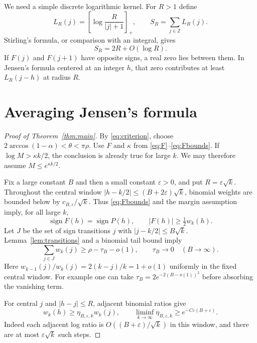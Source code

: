 \documentclass[11pt]{article}
\theoremstyle{remark}\newtheorem{remark}[theorem]{Remark}
\DeclareMathOperator{\sign}{sign}
\begin{document}
We need a simple discrete logarithmic kernel. For $R>1$ define
\[
 L_R(j)=\left[\log\frac{R}{|j|+1}\right]_+,
 \qquad S_R=\sum_{j\in\mathbb Z}L_R(j).
\]
Stirling's formula, or comparison with an integral, gives
\begin{equation}\label{eq:SR}
 S_R=2R+O(\log R).
\end{equation}
If $F(j)$ and $F(j+1)$ have opposite signs, a real zero lies between
them. In Jensen's formula centered at an integer $h$, that zero
contributes at least $L_R(j-h)$ at radius $R$.

\section{Averaging Jensen's formula}
\begin{proof}[Proof of Theorem~\ref{thm:main}]
By \eqref{eq:criterion}, choose
$2\arccos(1-\alpha)<\theta<\pi\rho$.
Use $F$ and $\kappa$ from \eqref{eq:F}--\eqref{eq:Fbounds}.
If $\log M>\kappa k/2$, the conclusion is already true for large $k$.
We may therefore assume $M\le e^{\kappa k/2}$.

Fix a large constant $B$ and then a small constant $\varepsilon>0$,
and put $R=\varepsilon\sqrt{k}$. Throughout the central window
$|h-k/2|\le(B+2\varepsilon)\sqrt{k}$, binomial weights are bounded
below by $c_{B,\varepsilon}/\sqrt{k}$. Thus \eqref{eq:Fbounds} and the
margin assumption imply, for all large $k$,
\begin{equation}\label{eq:anchors}
 \sign F(h)=\sign P(h),\qquad |F(h)|\ge\tfrac12 w_k(h).
\end{equation}
Let $J$ be the set of sign transitions $j$ with
$|j-k/2|\le B\sqrt{k}$. Lemma~\ref{lem:transitions} and a binomial tail
bound imply
\begin{equation}\label{eq:Jmass}
 \sum_{j\in J}w_k(j)\ge\rho-\tau_B-o(1),
 \qquad \tau_B\longrightarrow0\quad(B\longrightarrow\infty).
\end{equation}
Here $w_{k-1}(j)/w_k(j)=2(k-j)/k=1+o(1)$ uniformly in the fixed central
window. For example one can take
$\tau_B=2e^{-2(B-o(1))^2}$ before absorbing the vanishing term.

For central $j$ and $|h-j|\le R$, adjacent binomial ratios give
\begin{equation}\label{eq:ratios}
 w_k(h)\ge\eta_{B,\varepsilon,k}w_k(j),\qquad
 \liminf_{k\to\infty}\eta_{B,\varepsilon,k}
 \ge e^{-C\varepsilon(B+\varepsilon)}.
\end{equation}
Indeed each adjacent log ratio is $O((B+\varepsilon)/\sqrt{k})$ in
this window, and there are at most $\varepsilon\sqrt{k}$ such steps.


\end{proof}
\end{document}
